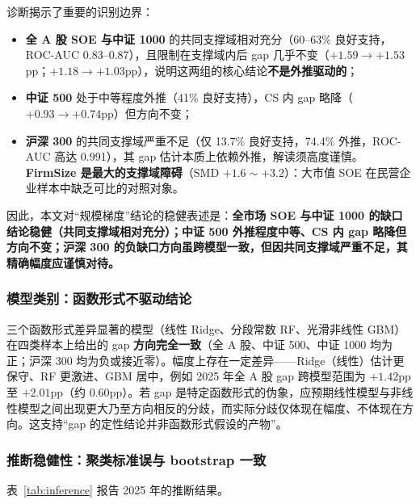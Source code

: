 \documentclass[11pt,a4paper]{ctexart}
\begin{document}
诊断揭示了重要的识别边界：

\begin{itemize}[leftmargin=2em,itemsep=2pt]
\item \textbf{全 A 股 SOE 与中证 1000} 的共同支撑域相对充分（60--63\% 良好支持，ROC-AUC 0.83--0.87），且限制在支撑域内后 gap 几乎不变（$+1.59\to+1.53$pp；$+1.18\to+1.03$pp），说明这两组的核心结论\textbf{不是外推驱动的}；
\item \textbf{中证 500} 处于中等程度外推（41\% 良好支持），CS 内 gap 略降（$+0.93\to+0.74$pp）但方向不变；
\item \textbf{沪深 300} 的共同支撑域严重不足（仅 13.7\% 良好支持，74.4\% 外推，ROC-AUC 高达 0.991），其 gap 估计本质上依赖外推，解读须高度谨慎。\textbf{FirmSize 是最大的支撑域障碍}（SMD $+1.6\sim+3.2$）：大市值 SOE 在民营企业样本中缺乏可比的对照对象。
\end{itemize}

因此，本文对“规模梯度”结论的稳健表述是：\textbf{全市场 SOE 与中证 1000 的缺口结论稳健（共同支撑域相对充分）；中证 500 外推程度中等、CS 内 gap 略降但方向不变；沪深 300 的负缺口方向虽跨模型一致，但因共同支撑域严重不足，其精确幅度应谨慎对待。}

\subsubsection{模型类别：函数形式不驱动结论}

三个函数形式差异显著的模型（线性 Ridge、分段常数 RF、光滑非线性 GBM）在四类样本上给出的 gap \textbf{方向完全一致}（全 A 股、中证 500、中证 1000 均为正；沪深 300 均为负或接近零）。幅度上存在一定差异——Ridge（线性）估计更保守、RF 更激进、GBM 居中，例如 2025 年全 A 股 gap 跨模型范围为 $+1.42$pp 至 $+2.01$pp（约 $0.60$pp）。若 gap 是特定函数形式的伪象，应预期线性模型与非线性模型之间出现更大乃至方向相反的分歧，而实际分歧仅体现在幅度、不体现在方向。这支持“gap 的定性结论并非函数形式假设的产物”。

\subsubsection{推断稳健性：聚类标准误与 bootstrap 一致}

表~\ref{tab:inference} 报告 2025 年的推断结果。
\end{document}
